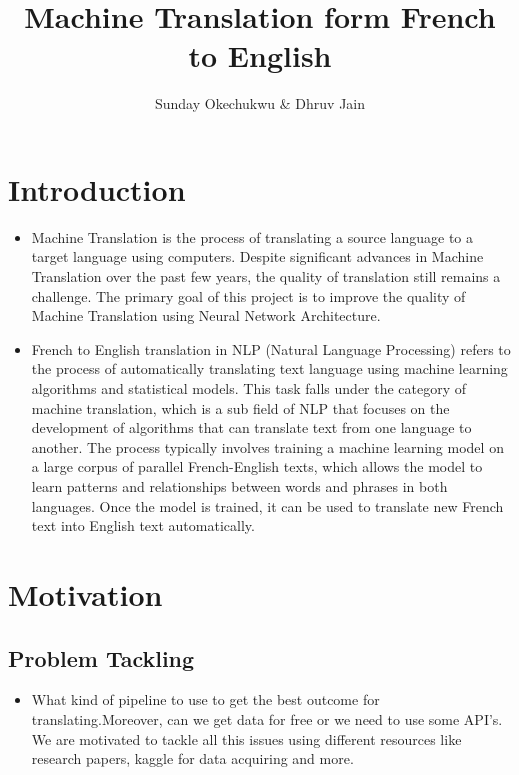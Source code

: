 \documentclass{article}
\title{Machine Translation form French to English}
\author{Sunday Okechukwu & Dhruv Jain }
\begin{document}
\maketitle

\section{Introduction}

    \begin{itemize}
        \item Machine Translation is the process of translating a source language to a target language using computers. Despite significant advances in Machine Translation over the past few years, the quality of translation still remains a challenge. The primary goal of this project is to improve the quality of Machine Translation using Neural Network Architecture. ~\cite{schwenk2007smooth}~\cite{rishita2019machine}
    \end{itemize}

    \begin{itemize}
        \item French to English translation in NLP (Natural Language Processing) refers to the process of automatically translating text language using machine learning algorithms and statistical models. This task falls under the category of machine translation, which is a sub field of NLP that focuses on the development of algorithms that can translate text from one language to another. The process typically involves training a machine learning model on a large corpus of parallel French-English texts, which allows the model to learn patterns and relationships between words and phrases in both languages. Once the model is trained, it can be used to translate new French text into English text automatically.
        ~\cite{NIPS2014_a14ac55a}
    \end{itemize}
    
\section{Motivation}

\subsection{Problem Tackling}
    \begin{itemize}
        \item What kind of pipeline to use to get the best outcome for translating.Moreover, can we get data for free or we need to use some  API's. We are motivated to tackle all this issues using different resources like research papers, kaggle for data acquiring and more.
    \end{itemize}
    
\end{document}
